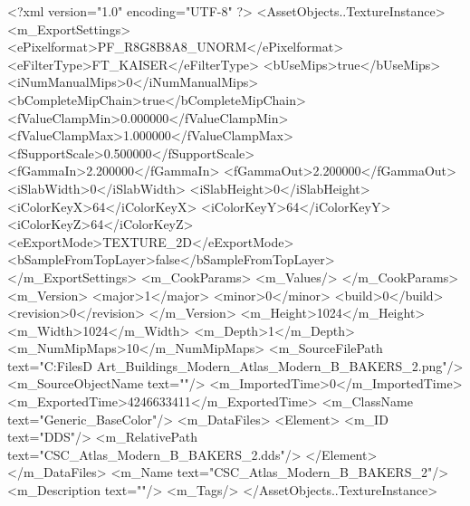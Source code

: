 <?xml version="1.0" encoding="UTF-8" ?>
<AssetObjects..TextureInstance>
	<m_ExportSettings>
		<ePixelformat>PF_R8G8B8A8_UNORM</ePixelformat>
		<eFilterType>FT_KAISER</eFilterType>
		<bUseMips>true</bUseMips>
		<iNumManualMips>0</iNumManualMips>
		<bCompleteMipChain>true</bCompleteMipChain>
		<fValueClampMin>0.000000</fValueClampMin>
		<fValueClampMax>1.000000</fValueClampMax>
		<fSupportScale>0.500000</fSupportScale>
		<fGammaIn>2.200000</fGammaIn>
		<fGammaOut>2.200000</fGammaOut>
		<iSlabWidth>0</iSlabWidth>
		<iSlabHeight>0</iSlabHeight>
		<iColorKeyX>64</iColorKeyX>
		<iColorKeyY>64</iColorKeyY>
		<iColorKeyZ>64</iColorKeyZ>
		<eExportMode>TEXTURE_2D</eExportMode>
		<bSampleFromTopLayer>false</bSampleFromTopLayer>
	</m_ExportSettings>
	<m_CookParams>
		<m_Values/>
	</m_CookParams>
	<m_Version>
		<major>1</major>
		<minor>0</minor>
		<build>0</build>
		<revision>0</revision>
	</m_Version>
	<m_Height>1024</m_Height>
	<m_Width>1024</m_Width>
	<m_Depth>1</m_Depth>
	<m_NumMipMaps>10</m_NumMipMaps>
	<m_SourceFilePath text="C:\Users\Shadow\Desktop\Working Files\3D Art\Textures\CSC_Buildings_Modern\Current\textures\CSC_Atlas_Modern_B_BAKERS_2.png"/>
	<m_SourceObjectName text=""/>
	<m_ImportedTime>0</m_ImportedTime>
	<m_ExportedTime>4246633411</m_ExportedTime>
	<m_ClassName text="Generic_BaseColor"/>
	<m_DataFiles>
		<Element>
			<m_ID text="DDS"/>
			<m_RelativePath text="CSC_Atlas_Modern_B_BAKERS_2.dds"/>
		</Element>
	</m_DataFiles>
	<m_Name text="CSC_Atlas_Modern_B_BAKERS_2"/>
	<m_Description text=""/>
	<m_Tags/>
</AssetObjects..TextureInstance>

